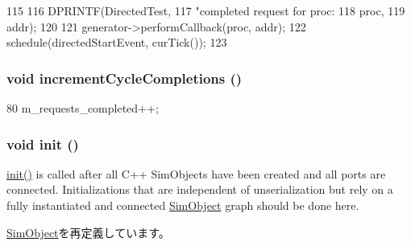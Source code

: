 \begin{DoxyCode}
115 {
116     DPRINTF(DirectedTest,
117             "completed request for proc: %
118             proc,
119             addr);
120 
121     generator->performCallback(proc, addr);    
122     schedule(directedStartEvent, curTick());
123 }
\end{DoxyCode}
\hypertarget{classRubyDirectedTester_a54b25b6592260a8ab819b318e46213b9}{
\subsubsection[{incrementCycleCompletions}]{\setlength{\rightskip}{0pt plus 5cm}void incrementCycleCompletions ()}}
\label{classRubyDirectedTester_a54b25b6592260a8ab819b318e46213b9}



\begin{DoxyCode}
80 { m_requests_completed++; }
\end{DoxyCode}
\hypertarget{classRubyDirectedTester_a02fd73d861ef2e4aabb38c0c9ff82947}{
\subsubsection[{init}]{\setlength{\rightskip}{0pt plus 5cm}void init ()}}
\label{classRubyDirectedTester_a02fd73d861ef2e4aabb38c0c9ff82947}
\hyperlink{classRubyDirectedTester_a02fd73d861ef2e4aabb38c0c9ff82947}{init()} is called after all C++ SimObjects have been created and all ports are connected. Initializations that are independent of unserialization but rely on a fully instantiated and connected \hyperlink{classSimObject}{SimObject} graph should be done here. 

\hyperlink{classSimObject_a02fd73d861ef2e4aabb38c0c9ff82947}{SimObject}を再定義しています。


